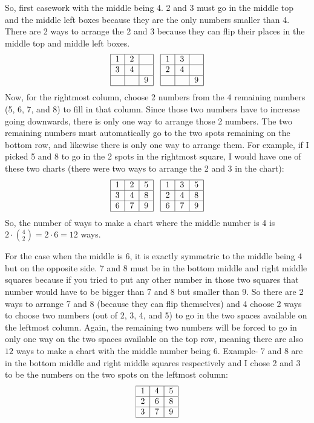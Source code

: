\begin{enumerate}
 So, first casework with the middle being 4. 2 and 3 must go in the middle top and the middle left boxes because they are the only numbers smaller than 4. There are 2 ways to arrange the 2 and 3 because they can flip their places in the middle top and middle left boxes. 
 \[\begin{tabular}{|c|c|c|}  \hline 1&2&\\ \hline 3&4&\\ \hline &&9\\ \hline \end{tabular} \;\;\; \begin{tabular}{|c|c|c|} \hline 1&3&\\ \hline 2&4&\\ \hline &&9\\ \hline \end{tabular}\]Now, for the rightmost column, choose 2 numbers from the 4 remaining numbers (5, 6, 7, and 8) to fill in that column. Since those two numbers have to increase going downwards, there is only one way to arrange those 2 numbers. The two remaining numbers must automatically go to the two spots remaining on the bottom row, and likewise there is only one way to arrange them. For example, if I picked 5 and 8 to go in the 2 spots in the rightmost square, I would have one of these two charts (there were two ways to arrange the 2 and 3 in the chart): 
 \[\begin{tabular}{|c|c|c|}  \hline 1&2&5\\ \hline 3&4&8\\ \hline 6&7&9\\ \hline \end{tabular} \;\;\; \begin{tabular}{|c|c|c|} \hline 1&3&5\\ \hline 2&4&8\\ \hline 6&7&9\\ \hline \end{tabular}\]So, the number of ways to make a chart where the middle number is 4 is $2 \cdot \binom{4}{2} = 2\cdot6 = 12$ ways.

 For the case when the middle is 6, it is exactly symmetric to the middle being 4 but on the opposite side. 7 and 8 must be in the bottom middle and right middle squares because if you tried to put any other number in those two squares that number would have to be bigger than 7 and 8 but smaller than 9. So there are 2 ways to arrange 7 and 8 (because they can flip themselves) and 4 choose 2 ways to choose two numbers (out of 2, 3, 4, and 5) to go in the two spaces available on the leftmost column. Again, the remaining two numbers will be forced to go in only one way on the two spaces available on the top row, meaning there are also $12$ ways to make a chart with the middle number being 6. Example- 7 and 8 are in the bottom middle and right middle squares respectively and I chose 2 and 3 to be the numbers on the two spots on the leftmost column:
 \[\begin{tabular}{|c|c|c|}  \hline 1&4&5\\ \hline 2&6&8\\ \hline 3&7&9\\ \hline \end{tabular}\]


\end{enumerate}
